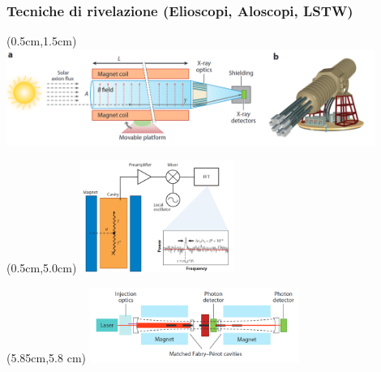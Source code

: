 \documentclass[10pt]{beamer}
\begin{document}
\begin{frame}
\frametitle{Tecniche di rivelazione (Elioscopi, Aloscopi, LSTW)}



\begin{textblock*}{12cm}(0.5cm,1.5cm) %
\includegraphics[width=12cm]{img2/helioscope.png}
\end{textblock*}


\begin{textblock*}{10cm}(0.5cm,5.0cm) 
\includegraphics[width=5.0cm]{img2/aloscopio_new.JPG}
\end{textblock*}

\begin{textblock*}{10cm}(5.85cm,5.8 cm) 
\includegraphics[width=6.8cm]{img2/lstw.png}
\end{textblock*}



\end{frame}
\end{document}
